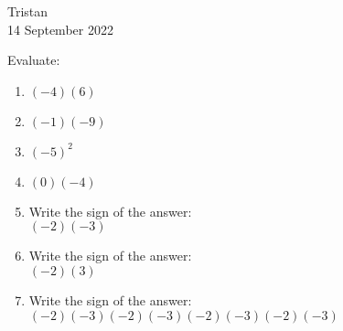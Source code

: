 \documentclass[14pt]{extarticle} %
\begin{document}
\hfill Tristan\\
\null\hfill 14 September 2022

\vspace{10mm}

Evaluate:
\begin{enumerate}[label=\Alph*.), itemsep=\fill]
\item $(-4)(6)$
\item $(-1)(-9)$
\item $(-5)^2$
\item $(0)(-4)$
\vfill\clearpage
\item Write the sign of the answer: \\
$(-2)(-3)$
\item Write the sign of the answer: \\
$(-2)(3)$
\item Write the sign of the answer: \\
$(-2)(-3)(-2)(-3)(-2)(-3)(-2)(-3)$
\vfill\end{enumerate}
\end{document}
